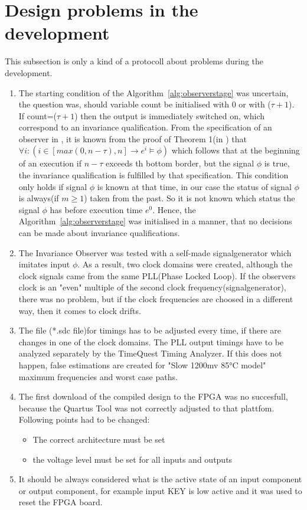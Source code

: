 \section{Design problems in the development}
\label{chapter:3:section:3}
This subsection is only a kind of a protocoll about problems during the development. 
\begin{enumerate}
\item The starting condition of the Algorithm~\ref{alg:observerstage} was uncertain, the question was, should variable
count be initialised with 0 or with ($\tau + 1$). If count=($\tau + 1$) then the output is immediately switched on, which
correspond to an invariance qualification. From the specification of an observer in \cite{RTFMBJ13}, it is known from
the proof of Theorem 1(in \cite{RTFMBJ13}) that $\forall i:(i \in [max(0,n-\tau),n] \rightarrow e^i \models \phi)$ which follows 
that at the beginning of an execution if $n-\tau$ exceeds th bottom border, but the signal $\phi$ is true, the invariance qualification
is fulfilled by that specification. 
This condition only holds if signal $\phi$ is known at that time, in our case the status of signal $\phi$ is always(if $m \ge 1$) taken from the past. 
So it is not known which status the signal $\phi$ has before execution time $e^0$. Hence, the Algorithm~\ref{alg:observerstage} was initialised in a manner, that
no decisions can be made about invariance qualifications. 
\item The Invariance Observer was tested with a  self-made signalgenerator which imitates input $\phi$. As a result, two clock domains were created, although the clock signals
came from the same PLL(Phase Locked Loop). If the observers clock is an "even" multiple of the second clock frequency(signalgenerator), there was no problem, but if the clock frequencies are choosed in a different way, then
it comes to clock drifts. 
\item The file (*.sdc file)for timings has to be adjusted every time, if there are changes in one of the clock domains. The PLL output timings have to be analyzed separately by the
TimeQuest Timing Analyzer. If this does not happen, false estimations are created for "Slow 1200mv 85°C model" maximum frequencies and worst case paths. 
\item The first download of the compiled design to the FPGA was no succesfull, because the Quartus Tool was not correctly adjusted to that plattfom. 
Following points had to be changed:
\begin{itemize}
\item The correct architecture must be set
\item the voltage level must be set for all inputs and outputs
\end{itemize}
\item It should be always considered what is the active state of an input component or output component, for example
input KEY is low active and it was used to reset the FPGA board. 
\end{enumerate} 
